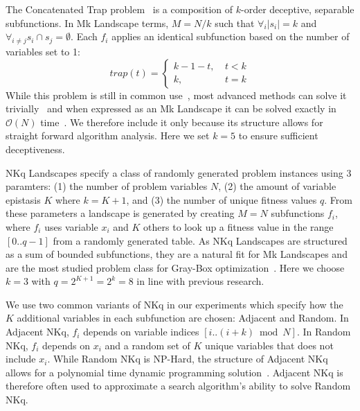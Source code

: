 \documentclass[runningheads,a4paper]{llncs}
\newcommand{\BigO}[1]{$\mathcal{O}{(#1)}$}
\begin{document}
The Concatenated Trap problem~\cite{deb:1992:trap} is a composition of $k$-order deceptive,
separable subfunctions. In Mk Landscape terms, $M=N/k$ such that $\forall_i |s_i| = k$ and
$\forall_{i \neq j} s_i \cap s_j = \emptyset$. Each $f_i$ applies an identical subfunction based
on the number of variables set to 1:
\begin{equation}
   trap(t) = \left\{
     \begin{array}{rl}
       k-1-t,~ &  t<k\\
       k,~   &  t = k
     \end{array}
   \right.
  \label{eq-trap}
\end{equation}
While this problem is still in common use~\cite{hsu:2015:dsmgaII,inoue:2015:adaptivep3},
most advanced methods can solve it trivially~\cite{goldman:2012:ltga} and when expressed
as an Mk Landscape it can be solved exactly in \BigO{N} time~\cite{whitley:2015:mk}.
We therefore include it only because its structure allows for straight forward algorithm analysis.
Here we set $k=5$ to ensure sufficient deceptiveness.

NKq Landscapes specify a class of randomly generated problem instances using 3 paramters:
(1) the number of problem variables $N$, (2) the amount of variable epistasis $K$ where $k=K+1$,
and (3) the number of unique fitness values $q$. From these parameters a landscape is generated
by creating $M=N$ subfunctions $f_i$, where $f_i$ uses variable $x_i$ and $K$ others to look up
a fitness value in the range $[0..q-1]$ from a randomly generated table.
As NKq Landscapes are structured as a sum of bounded subfunctions, they are a natural fit
for Mk Landscapes
and are the most studied problem class for Gray-Box
optimization~\cite{whitley:2012:constant,chicano:2014:ball,goldman:2015:GBO,tintos:2015:partitioncross,ochoa:2015:crossovernetworks,whitley:2015:mk}.
Here we choose $k=3$ with $q=2^{K+1}=2^{k}=8$ in line with previous research.

We use two common variants of NKq in our experiments which specify how the $K$ additional
variables in each subfunction are chosen: Adjacent and Random. In Adjacent NKq, $f_i$ depends
on variable indices $[i..(i+k) \bmod N]$. In Random NKq, $f_i$ depends on $x_i$ and a random
set of $K$ unique variables that does not include $x_i$. While Random NKq is NP-Hard,
the structure of Adjacent NKq allows for a polynomial time dynamic programming solution~\cite{wright:2000:solvingnk}.
Adjacent NKq is therefore often used to approximate a search algorithm's ability to
solve Random NKq.
\end{document}
